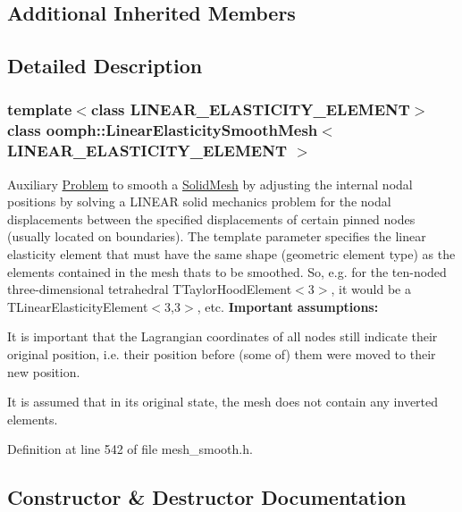 \subsection*{Additional Inherited Members}


\subsection{Detailed Description}
\subsubsection*{template$<$class L\+I\+N\+E\+A\+R\+\_\+\+E\+L\+A\+S\+T\+I\+C\+I\+T\+Y\+\_\+\+E\+L\+E\+M\+E\+NT$>$\newline
class oomph\+::\+Linear\+Elasticity\+Smooth\+Mesh$<$ L\+I\+N\+E\+A\+R\+\_\+\+E\+L\+A\+S\+T\+I\+C\+I\+T\+Y\+\_\+\+E\+L\+E\+M\+E\+N\+T $>$}

Auxiliary \hyperlink{classoomph_1_1Problem}{Problem} to smooth a \hyperlink{classoomph_1_1SolidMesh}{Solid\+Mesh} by adjusting the internal nodal positions by solving a L\+I\+N\+E\+AR solid mechanics problem for the nodal displacements between the specified displacements of certain pinned nodes (usually located on boundaries). The template parameter specifies the linear elasticity element that must have the same shape (geometric element type) as the elements contained in the mesh that\textquotesingle{}s to be smoothed. So, e.\+g. for the ten-\/noded three-\/dimensional tetrahedral T\+Taylor\+Hood\+Element$<$3$>$, it would be a T\+Linear\+Elasticity\+Element$<$3,3$>$, etc. {\bfseries Important} {\bfseries assumptions\+:} 
\begin{DoxyItemize}
\item It is important that the Lagrangian coordinates of all nodes still indicate their original position, i.\+e. their position before (some of) them were moved to their new position.
\item It is assumed that in its original state, the mesh does not contain any inverted elements.
\end{DoxyItemize}

Definition at line 542 of file mesh\+\_\+smooth.\+h.



\subsection{Constructor \& Destructor Documentation}
\mbox{\label{classoomph_1_1LinearElasticitySmoothMesh_a8c7add2f256d8abc8ae9304217ee2996}} 
